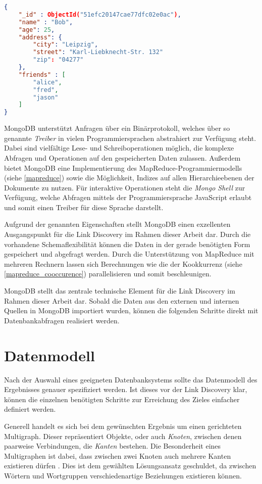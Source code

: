 \begin{lstlisting}[language=json, label={lst:json}, caption={Ein Beispiel für ein Dokument in MongoDB}]
{
    "_id" : ObjectId("51efc20147cae77dfc02e0ac"),
    "name" : "Bob",
    "age": 25,
    "address": {
        "city": "Leipzig",
        "street": "Karl-Liebknecht-Str. 132"
        "zip": "04277"
    },
    "friends" : [
        "alice",
        "fred",
        "jason"
    ]
}
\end{lstlisting}

MongoDB unterstützt Anfragen über ein Binärprotokoll, welches über so genannte \emph{Treiber} in vielen Programmiersprachen abstrahiert zur Verfügung steht. Dabei sind vielfältige Lese- und Schreiboperationen möglich, die komplexe Abfragen und Operationen auf den gespeicherten Daten zulassen. Außerdem bietet MongoDB eine Implementierung des MapReduce-Programmiermodells (siehe \ref{mapreduce}) sowie die Möglichkeit, Indizes auf allen Hierarchieebenen der Dokumente zu nutzen. Für interaktive Operationen steht die \emph{Mongo Shell} zur Verfügung, welche Abfragen mittels der Programmiersprache JavaScript erlaubt und somit einen Treiber für diese Sprache darstellt.

Aufgrund der genannten Eigenschaften stellt MongoDB einen exzellenten Ausgangspunkt für die Link Discovery im Rahmen dieser Arbeit dar. Durch die vorhandene Schemaflexibilität können die Daten in der gerade benötigten Form gespeichert und abgefragt werden. Durch die Unterstützung von MapReduce mit mehreren Rechnern lassen sich Berechnungen wie die der Kookkurrenz (siehe \ref{mapreduce_cooccurence}) parallelisieren und somit beschleunigen.

MongoDB stellt das zentrale technische Element für die Link Discovery im Rahmen dieser Arbeit dar. Sobald die Daten aus den externen und internen Quellen in MongoDB importiert wurden, können die folgenden Schritte direkt mit Datenbankabfragen realisiert werden.

\section{Datenmodell}

Nach der Auswahl eines geeigneten Datenbanksystems sollte das Datenmodell des Ergebnisses genauer spezifiziert werden. Ist dieses vor der Link Discovery klar, können die einzelnen benötigten Schritte zur Erreichung des Zieles einfacher definiert werden.

Generell handelt es sich bei dem gewünschten Ergebnis um einen gerichteten Multigraph. Dieser repräsentiert Objekte, oder auch \emph{Knoten}, zwischen denen paarweise Verbindungen, die \emph{Kanten} bestehen. Die Besonderheit eines Multigraphen ist dabei, dass zwischen zwei Knoten auch mehrere Kanten existieren dürfen \cite{rd2012}. Dies ist dem gewählten Lösungsansatz geschuldet, da zwischen Wörtern und Wortgruppen verschiedenartige Beziehungen existieren können.


